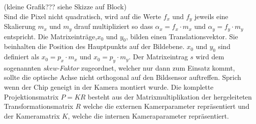(kleine Grafik??? siehe Skizze auf Block)\\ 

Sind die Pixel nicht quadratisch, wird auf die Werte $f_x$ und $f_y$ jeweils eine Skalierung $m_x$ und $m_y$ drauf multipliziert so dass  $\alpha_x = f_x \cdot m_x$ und $\alpha_y = f_y \cdot m_y$ entspricht\cite{HZ}. Die Matrixeinträge,$x_{0}$ und $y_{0}$, bilden einen Translationsvektor. Sie beinhalten die Position des Hauptpunkts auf der Bildebene. $x_{0}$ und $y_{0}$ sind definiert als $x_{0} = p_x \cdot m_x$ und $x_{0} = p_y \cdot m_y$. Der Matrixeintrag $s$ wird dem sogenannten \textit{skew-Faktor} zugeordnet, welcher nur dann zum Einsatz kommt, sollte die optische Achse nicht orthogonal auf den Bildsensor auftreffen. Sprich wenn der Chip geneigt in der Kamera montiert wurde\cite{HZ}. Die komplette Projektionsmatrix $P=KR$\cite{HZ} besteht aus der Matrixmultiplikation der hergeleiteten Transformationsmatrix $R$ welche die externen Kamerparameter repräsentiert und der Kameramatrix $K$, welche die internen Kameraparameter repräsentiert\cite{HZ,ZZGXr}.


